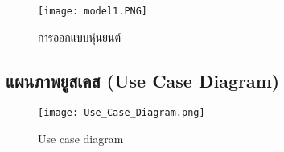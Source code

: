\begin{figure}[ht]
    \centering
    \texttt{[image: model1.PNG]}
    \caption{การออกแบบหุ่นยนต์}
    \label{fig:circuit}
\end{figure}

\subsection{แผนภาพยูสเคส (Use Case Diagram)}
\begin{figure}[ht]
    \centering
    \texttt{[image: Use\_Case\_Diagram.png]}
    \caption{Use case diagram}
    \label{fig:Use_Case_Diagram}
\end{figure}
